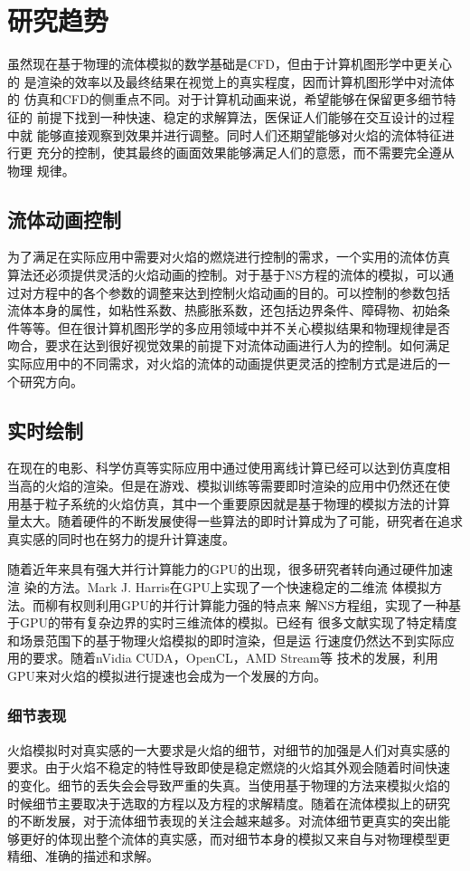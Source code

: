 \section{研究趋势}
虽然现在基于物理的流体模拟的数学基础是CFD，但由于计算机图形学中更关心的
是渲染的效率以及最终结果在视觉上的真实程度，因而计算机图形学中对流体的
仿真和CFD的侧重点不同。对于计算机动画来说，希望能够在保留更多细节特征的
前提下找到一种快速、稳定的求解算法，医保证人们能够在交互设计的过程中就
能够直接观察到效果并进行调整。同时人们还期望能够对火焰的流体特征进行更
充分的控制，使其最终的画面效果能够满足人们的意愿，而不需要完全遵从物理
规律。

\subsection{流体动画控制}
为了满足在实际应用中需要对火焰的燃烧进行控制的需求，一个实用的流体仿真
算法还必须提供灵活的火焰动画的控制。对于基于NS方程的流体的模拟，可以通
过对方程中的各个参数的调整来达到控制火焰动画的目的。可以控制的参数包括
流体本身的属性，如粘性系数、热膨胀系数，还包括边界条件、障碍物、初始条
件等等。但在很计算机图形学的多应用领域中并不关心模拟结果和物理规律是否
吻合，要求在达到很好视觉效果的前提下对流体动画进行人为的控制。如何满足
实际应用中的不同需求，对火焰的流体的动画提供更灵活的控制方式是进后的一
个研究方向。

\subsection{实时绘制}
在现在的电影、科学仿真等实际应用中通过使用离线计算已经可以达到仿真度相
当高的火焰的渲染。但是在游戏、模拟训练等需要即时渲染的应用中仍然还在使
用基于粒子系统的火焰仿真，其中一个重要原因就是基于物理的模拟方法的计算
量太大。随着硬件的不断发展使得一些算法的即时计算成为了可能，研究者在追求
真实感的同时也在努力的提升计算速度。

随着近年来具有强大并行计算能力的GPU的出现，很多研究者转向通过硬件加速渲
染的方法。Mark J. Harris\cite{Harris}在GPU上实现了一个快速稳定的二维流
体模拟方法。而柳有权\cite{Liuyouquan}则利用GPU的并行计算能力强的特点来
解NS方程组，实现了一种基于GPU的带有复杂边界的实时三维流体的模拟。已经有
很多文献实现了特定精度和场景范围下的基于物理火焰模拟的即时渲染，但是运
行速度仍然达不到实际应用的要求。随着nVidia CUDA，OpenCL，AMD Stream等
技术的发展，利用GPU来对火焰的模拟进行提速也会成为一个发展的方向。

\subsubsection{细节表现}
火焰模拟时对真实感的一大要求是火焰的细节，对细节的加强是人们对真实感的
要求。由于火焰不稳定的特性导致即使是稳定燃烧的火焰其外观会随着时间快速
的变化。细节的丢失会会导致严重的失真。当使用基于物理的方法来模拟火焰的
时候细节主要取决于选取的方程以及方程的求解精度。随着在流体模拟上的研究
的不断发展，对于流体细节表现的关注会越来越多。对流体细节更真实的突出能
够更好的体现出整个流体的真实感，而对细节本身的模拟又来自与对物理模型更
精细、准确的描述和求解。

